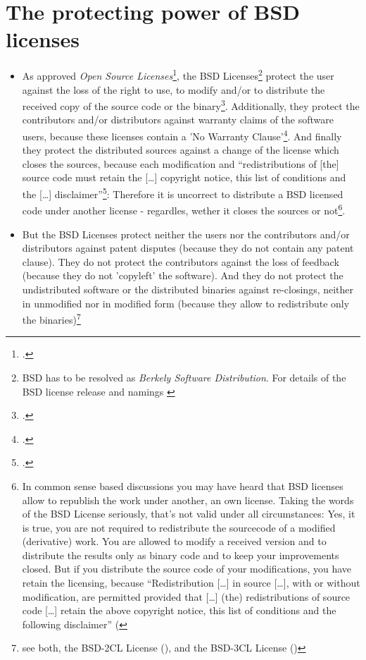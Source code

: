 \section{The protecting power of BSD licenses}
\begin{itemize}
  \item As approved \emph{Open Source Licenses}\footcite[cf.][\nopage
  wp]{OSI2012b}, the BSD Licenses\footnote{BSD has to be resolved as
  \emph{Berkely Software Distribution}. For details of the BSD license release
  and namings \cite[cf.][\nopage wp. editorial]{BsdLicense3Clause}} protect the
  user against the loss of the right to use, to modify and/or to distribute the
  received copy of the source code or the binary\footcite[cf.][\nopage wp
  §1ff]{OSI2012a}. Additionally, they protect the contributors and/or
  distributors against warranty claims of the software users, because these
  licenses contain a 'No Warranty Clause'\footcite[one for all version
  cf.][\nopage wp]{BsdLicense2Clause}. And finally they protect the distributed
  sources against a change of the license which closes the sources, because each
  modification and \enquote{redistributions of [the] source code must retain the
  [\ldots] copyright notice, this list of conditions and the [\ldots]
  disclaimer}\footcite[cf.][\nopage wp]{BsdLicense2Clause}: Therefore it is
  uncorrect to distribute a BSD licensed code under another license - regardles,
  wether it closes the sources or not\footnote{In common sense based discussions
  you may have heard that BSD licenses allow to republish the work under
  another, an own license. Taking the words of the BSD License seriously, that's
  not valid under all circumstances: Yes, it is true, you are not required to 
  redistribute the sourcecode of a modified (derivative) work. You are allowed 
  to modify a received version and to distribute the results only as binary code 
  and to keep your improvements closed. But if you distribute the source code of 
  your modifications, you have retain the licensing, because 
  \enquote{Redistribution [\ldots] in source [\ldots], with or without 
  modification, are permitted provided that [\ldots] (the) redistributions of 
  source code [\ldots] retain the above copyright notice, this list of 
  conditions and the following disclaimer} 
  (\cite[cf.][\nopage wp]{BsdLicense2Clause}}.
  
  \item But the BSD Licenses protect neither the users nor the contributors
  and/or distributors against patent disputes (because they do not contain any
  patent clause). They do not protect the contributors against the loss of
  feedback (because they do not 'copyleft' the software). And they do not
  protect the undistributed software or the distributed binaries against
  re-closings, neither in unmodified nor in modified form (because they allow to
  redistribute only the binaries)\footnote{see both, the BSD-2CL License
  (\cite[cf.][\nopage wp]{BsdLicense2Clause}), and the BSD-3CL License
  (\cite[cf.][\nopage wp]{BsdLicense3Clause})}
  
\end{itemize}

